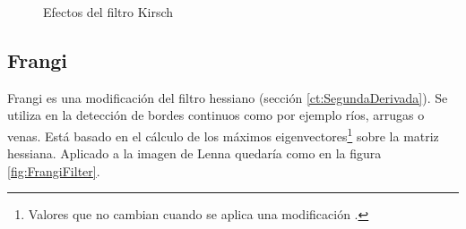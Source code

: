\begin{figure}[H]
\centering
{}
\caption{Efectos del filtro Kirsch}
\label{fig:KirschEffects}
\end{figure}

\subsection{Frangi}
\label{Frangi}
Frangi \cite{skimage:Frangi} es una modificación del filtro hessiano (sección \ref{ct:SegundaDerivada}). Se utiliza en la detección de bordes continuos como por ejemplo ríos, arrugas o venas. Está basado en el cálculo de los máximos eigenvectores\footnote{Valores que no cambian cuando se aplica una modificación \cite{wiki:Eigenvector}.} sobre la matriz hessiana. Aplicado a la imagen de Lenna \cite{wiki:Lenna} quedaría como en la figura \ref{fig:FrangiFilter}.


